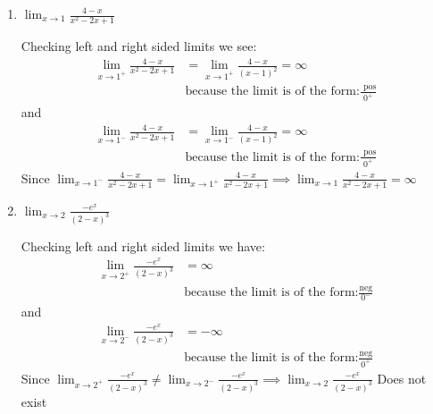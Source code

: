 \documentclass[nooutcomes, handout]{ximera}
\begin{document}
\begin{problem}
\begin{enumerate}
    \item
      $\displaystyle \lim_{x \to 1} \frac{4-x}{x^2 - 2x + 1}$
      \begin{freeResponse}
        Checking left and right sided limits we see:
        \begin{align*}
          \lim_{x \to 1^+} \frac{4-x}{x^2 - 2x + 1} &= \lim_{x \to 1^+}\frac{4-x}{(x-1)^2} = \infty\\
	&\text{because the limit is of the form:} \frac{\text{ pos}}{0^+}
        \end{align*}
 	 and
        \begin{align*}
 	\lim_{x \to 1^-} \frac{4-x}{x^2 - 2x + 1} &= \lim_{x \to 1^-}\frac{4-x}{(x-1)^2} = \infty\\
	&\text{because the limit is of the form:} \frac{\text{ pos}}{0^+}
	\end{align*}
	Since $\lim_{x \to 1^-} \frac{4-x}{x^2 - 2x + 1}=\lim_{x \to 1^+} \frac{4-x}{x^2 - 2x + 1} \implies  \lim_{x \to 1} \frac{4-x}{x^2 - 2x + 1} = \infty$
      \end{freeResponse}

    \item
      $\displaystyle \lim_{x \to 2} \frac{-e^x}{(2-x)^3}$
      \begin{freeResponse}
        Checking left and right sided limits we have:
 \begin{align*}
          \lim_{x \to 2^+} \frac{-e^x}{(2-x)^3} &= \infty\\
	&\text{because the limit is of the form:} \frac{\text{neg}}{0^-}
        \end{align*}
 	 and
        \begin{align*}
 	\lim_{x \to 2^-} \frac{-e^x}{(2-x)^3} &= - \infty\\
	&\text{because the limit is of the form:} \frac{\text{neg}}{0^+}
	\end{align*}
	Since $ \lim_{x \to 2^+} \frac{-e^x}{(2-x)^3} \ne \lim_{x \to 2^-} \frac{-e^x}{(2-x)^3} \implies   \lim_{x \to 2} \frac{-e^x}{(2-x)^3}$ Does not exist
      \end{freeResponse}
\end{enumerate}
\end{problem}
\end{document}
